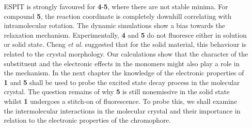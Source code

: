 ESPIT is strongly favoured for \textbf{4}-\textbf{5}, where there are not stable \Estar{} minima. For compound \textbf{5}, the reaction coordinate is completely downhill correlating with intramolecular rotation. The dynamic simulations show a bias towards the \Kstar{} relaxation mechanism. Experimentally, \textbf{4} and \textbf{5} do not fluoresce either in solution or solid state. Cheng \textit{et al.} suggested that for the solid material, this behaviour is related to the crystal morphology.\cite{Cheng2015} Our calculations show that the character of the substituent and the electronic effects in the monomers might also play a role in the mechanism. In the next chapter the knowledge of the electronic properties of \textbf{1} and \textbf{5} shall be used to probe the excited state decay process in the molecular crystal. The question remains of why \textbf{5} is still nonemissive in the solid state whilst \textbf{1} undergoes a stitch-on of fluorescence. To probe this, we shall examine the intermolecular interactions in the molecular crystal and their importance in relation to the electronic properties of the chromophore. 



